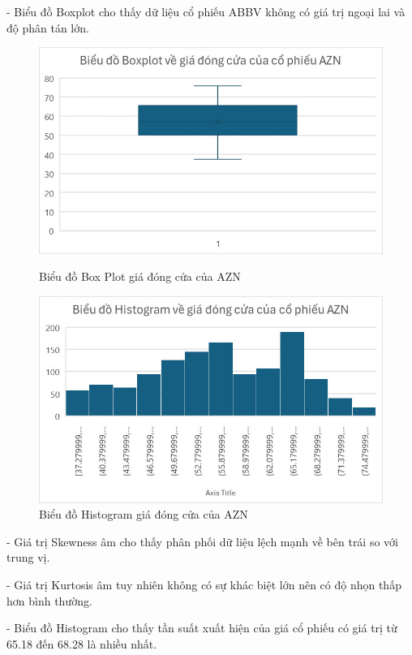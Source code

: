 \documentclass[conference]{IEEEtran}
\begin{document}
- Biểu đồ Boxplot cho thấy dữ liệu cổ phiếu ABBV không có giá trị ngoại lai và độ phân tán lớn.
\begin{figure}[H]
    \centering
    \begin{minipage}{0.23\textwidth}
    \centering
    \includegraphics[width=1\textwidth]{Image/AZN_Boxplot.jpg}
    \caption{Biểu đồ Box Plot giá đóng cửa của AZN}
    \label{fig:1}
    \end{minipage}
    \hfill
    \begin{minipage}{0.23\textwidth}
    \centering
    \includegraphics[width=1\textwidth]{Image/AZN_Histogram.jpg}
    \caption{Biểu đồ Histogram giá đóng cửa của AZN}
    \label{fig:2}
    \end{minipage}
\end{figure}
- Giá trị Skewness âm cho thấy phân phối dữ liệu lệch mạnh về bên trái so với trung vị.

- Giá trị Kurtosis âm tuy nhiên không có sự khác biệt lớn nên có độ nhọn thấp hơn bình thường.

- Biểu đồ Histogram cho thấy tần suất xuất hiện của giá cổ phiếu có giá trị từ 65.18 đến 68.28 là nhiều nhất.
\end{document}
